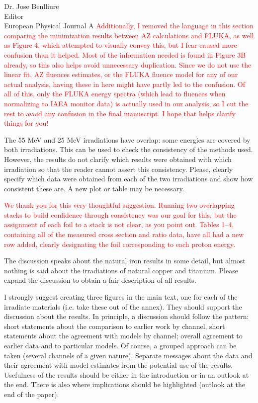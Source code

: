 \documentclass{letter} %
\newcommand{\colornote}[1]{\textcolor{red}{#1}}
\begin{document}
\begin{letter}{Dr. Jose Benlliure \\
Editor \\
European Physical Journal A}
\colornote{Additionally, I removed the language in this section comparing the minimization results between AZ calculations and FLUKA, as well as Figure 4, which attempted to visually convey this, but I fear caused more confusion than it helped.  Most of the information needed is found in Figure 3B already, so this also helps avoid unnecessary duplication. Since we do not use the linear fit, AZ fluences estimates, or the FLUKA fluence model for any of our actual analysis,  having these in here might have partly led to the confusion.  Of all of this, only the FLUKA energy spectra (which lead to fluences when normalizing to IAEA monitor data) is actually used in our analysis, so I cut the rest to avoid any confusion in the final manuscript.  I hope that helps clarify things for you!}


The 55 MeV and 25 MeV irradiations have overlap: some energies are covered by both irradiations. This can be used to check the consistency of the methods used. However, the results do not clarify which results were obtained with which irradiation so that the reader cannot assert this consistency. Please, clearly specify which data were obtained from each of the two irradiations and show how consistent these are. A new plot or table may be necessary.

\colornote{We thank you for this very thoughtful suggestion. Running two overlapping stacks to build confidence through consistency was our goal for this, but the assignment of each foil to a stack is not clear, as you point out.  Tables 1--4, containing all of the measured cross section and ratio data, have all had a new row added, clearly designating the foil corresponding to each proton energy.}

The discussion speaks about the natural iron results in some detail, but almost nothing is said about the irradiations of natural copper and titanium. Please expand the discussion to obtain a fair description of all results.

I strongly suggest creating three figures in the main text, one for each of the irradiate materials (i.e. take these out of the annex). They should support the discussion about the results. In principle, a discussion should follow the pattern: short statements about the comparison to earlier work by channel, short statements about the agreement with models by channel; overall agreement to earlier data and to particular models. Of course, a grouped approach can be taken (several channels of a given nature). Separate messages about the data and their agreement with model estimates from the potential use of the results. Usefulness of the results should be either in the introduction or in an outlook at the end. There is also where implications should be highlighted (outlook at the end of the paper).


\end{letter}
\end{document}
